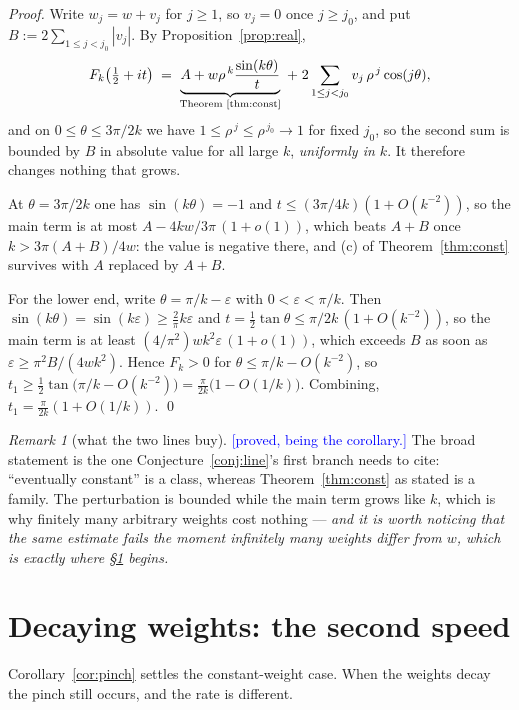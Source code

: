 \documentclass[11pt,a4paper]{article}
\theoremstyle{plain}
\theoremstyle{definition}
\theoremstyle{remark}
\newtheorem{remark}[theorem]{Remark}
\newcommand{\STATUS}[1]{\textcolor{blue}{\textsf{[#1]}}}
\begin{document}
\begin{proof}
Write $w_j=w+v_j$ for $j\ge1$, so $v_j=0$ once $j\ge j_0$, and put
$B:=2\sum_{1\le j<j_0}|v_j|$. By Proposition~\ref{prop:real},
\[
  F_k\!\left(\tfrac12+it\right)
  \;=\;\underbrace{A+w\rho^{\,k}\frac{\sin(k\theta)}{t}}_{\text{Theorem~\ref{thm:const}}}
  \;+\;2\sum_{1\le j<j_0}v_j\,\rho^{\,j}\cos(j\theta),
\]
and on $0\le\theta\le 3\pi/2k$ we have $1\le\rho^{\,j}\le\rho^{\,j_0}\to1$ for fixed
$j_0$, so the second sum is bounded by $B$ in absolute value for all large $k$,
\emph{uniformly in $k$}. It therefore changes nothing that grows.

At $\theta=3\pi/2k$ one has $\sin(k\theta)=-1$ and $t\le(3\pi/4k)(1+O(k^{-2}))$, so the
main term is at most $A-4kw/3\pi\,(1+o(1))$, which beats $A+B$ once
$k>3\pi(A+B)/4w$: the value is negative there, and (c) of
Theorem~\ref{thm:const} survives with $A$ replaced by $A+B$.

For the lower end, write $\theta=\pi/k-\varepsilon$ with $0<\varepsilon<\pi/k$. Then
$\sin(k\theta)=\sin(k\varepsilon)\ge \tfrac{2}{\pi}k\varepsilon$ and
$t=\tfrac12\tan\theta\le\pi/2k\,(1+O(k^{-2}))$, so the main term is at least
$(4/\pi^{2})wk^{2}\varepsilon\,(1+o(1))$, which exceeds $B$ as soon as
$\varepsilon\ge\pi^{2}B/(4wk^{2})$. Hence $F_k>0$ for
$\theta\le\pi/k-O(k^{-2})$, so $t_1\ge\tfrac12\tan\bigl(\pi/k-O(k^{-2})\bigr)
=\tfrac{\pi}{2k}\bigl(1-O(1/k)\bigr)$. Combining, $t_1=\tfrac{\pi}{2k}(1+O(1/k))$. \qed
\end{proof}

\begin{remark}[what the two lines buy]\label{rem:whybroader}
\STATUS{proved, being the corollary.}
The broad statement is the one Conjecture~\ref{conj:line}'s first branch needs to cite:
``eventually constant'' is a class, whereas Theorem~\ref{thm:const} as stated is a
family. The perturbation is bounded while the main term grows like $k$, which is why
finitely many arbitrary weights cost nothing --- \emph{and it is worth noticing that the
same estimate fails the moment infinitely many weights differ from $w$, which is exactly
where \S\ref{sec:decay} begins.}
\end{remark}

\section{Decaying weights: the second speed}\label{sec:decay}

Corollary~\ref{cor:pinch} settles the constant-weight case. When the weights decay the
pinch still occurs, and the rate is different.
\end{document}
